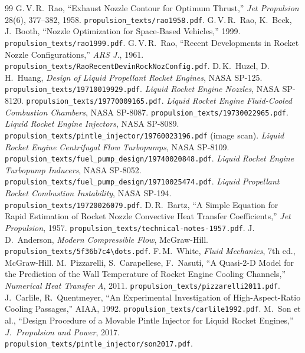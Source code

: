 \documentclass[11pt]{article}
\newcommand{\cmd}[1]{\nolinkurl{#1}}
\begin{document}
\begin{thebibliography}{99}
\small
{} G.\,V.\,R.\ Rao, ``Exhaust Nozzle Contour for Optimum Thrust,''
\emph{Jet Propulsion} 28(6), 377--382, 1958. \cmd{propulsion\_texts/rao1958.pdf}.
 G.\,V.\,R.\ Rao, K.\ Beck, J.\ Booth, ``Nozzle Optimization for
Space-Based Vehicles,'' 1999. \cmd{propulsion\_texts/rao1999.pdf}.
 G.\,V.\,R.\ Rao, ``Recent Developments in Rocket Nozzle
Configurations,'' \emph{ARS J.}, 1961. \cmd{propulsion\_texts/RaoRecentDevinRockNozConfig.pdf}.
 D.\,K.\ Huzel, D.\,H.\ Huang, \emph{Design of Liquid Propellant
Rocket Engines}, NASA SP-125. \cmd{propulsion\_texts/19710019929.pdf}.
 \emph{Liquid Rocket Engine Nozzles}, NASA SP-8120.
\cmd{propulsion\_texts/19770009165.pdf}.
 \emph{Liquid Rocket Engine Fluid-Cooled Combustion Chambers},
NASA SP-8087. \cmd{propulsion\_texts/19730022965.pdf}.
 \emph{Liquid Rocket Engine Injectors}, NASA SP-8089.
\cmd{propulsion\_texts/pintle\_injector/19760023196.pdf} (image scan).
 \emph{Liquid Rocket Engine Centrifugal Flow Turbopumps}, NASA
SP-8109. \cmd{propulsion\_texts/fuel\_pump\_design/19740020848.pdf}.
 \emph{Liquid Rocket Engine Turbopump Inducers}, NASA SP-8052.
\cmd{propulsion\_texts/fuel\_pump\_design/19710025474.pdf}.
 \emph{Liquid Propellant Rocket Combustion Instability}, NASA
SP-194. \cmd{propulsion\_texts/19720026079.pdf}.
 D.\,R.\ Bartz, ``A Simple Equation for Rapid Estimation of
Rocket Nozzle Convective Heat Transfer Coefficients,'' \emph{Jet Propulsion},
1957. \cmd{propulsion\_texts/technical-notes-1957.pdf}.
 J.\,D.\ Anderson, \emph{Modern Compressible Flow}, McGraw-Hill.
\cmd{propulsion\_texts/5f36b7c4\dots.pdf}.
 F.\,M.\ White, \emph{Fluid Mechanics}, 7th ed., McGraw-Hill.
 M.\ Pizzarelli, S.\ Carapellese, F.\ Nasuti, ``A
Quasi-2-D Model for the Prediction of the Wall Temperature of Rocket Engine
Cooling Channels,'' \emph{Numerical Heat Transfer A}, 2011.
\cmd{propulsion\_texts/pizzarelli2011.pdf}.
 J.\ Carlile, R.\ Quentmeyer, ``An Experimental
Investigation of High-Aspect-Ratio Cooling Passages,'' AIAA, 1992.
\cmd{propulsion\_texts/carlile1992.pdf}.
 M.\ Son et al., ``Design Procedure of a Movable Pintle
Injector for Liquid Rocket Engines,'' \emph{J.\ Propulsion and Power}, 2017.
\cmd{propulsion\_texts/pintle\_injector/son2017.pdf}.

\end{thebibliography}
\end{document}
